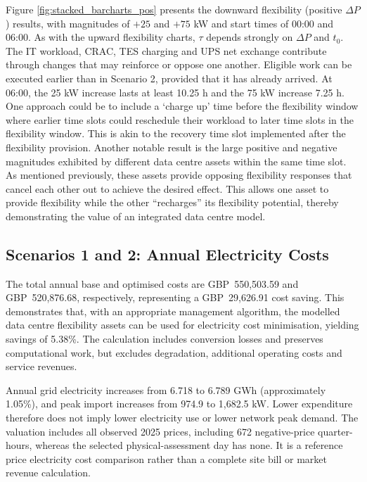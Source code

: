 \documentclass[lettersize,journal]{IEEEtran}
\newcommand{\rev}[1]{#1}
\begin{document}
\rev{Figure \ref{fig:stacked_barcharts_pos} presents the downward flexibility (positive $\Delta P$) results, with magnitudes of $+25$ and $+75$ kW and start times of 00:00 and 06:00.} As  with the upward flexibility charts, $\tau$ depends strongly on  $\Delta P$ and $t_0$. The IT workload, CRAC, TES charging and UPS net exchange contribute through changes that may reinforce or oppose one another. Eligible work can be executed earlier than in Scenario 2, provided that it has already arrived. At 06:00, the 25 kW increase lasts at least 10.25 h and the 75 kW increase 7.25 h. One approach could be to include a `charge up' time before the flexibility window where earlier time slots could reschedule their workload to later time slots in the flexibility window. This is akin to the recovery time slot implemented after the flexibility provision. Another notable result is the large positive and negative magnitudes exhibited by different data centre assets within the same time slot. As mentioned previously, these assets provide opposing flexibility responses that cancel each other out to achieve the desired effect. This allows one asset to provide flexibility while the other ``recharges'' its flexibility potential, thereby demonstrating the value of an integrated data centre model.

\subsection{Scenarios 1 and 2: Annual Electricity Costs}
\rev{The total annual base and optimised costs are GBP~550,503.59 and GBP~520,876.68, respectively, representing a GBP~29,626.91 cost saving. This demonstrates that, with an appropriate management algorithm, the modelled data centre flexibility assets can be used for electricity cost minimisation, yielding savings of 5.38\%. The calculation includes conversion losses and preserves computational work, but excludes degradation, additional operating costs and service revenues.}

Annual grid electricity increases from 6.718 to 6.789 GWh (approximately 1.05\%), and peak import increases from 974.9 to 1,682.5 kW. Lower expenditure therefore does not imply lower electricity use or lower network peak demand. The valuation includes all observed 2025 prices, including 672 negative-price quarter-hours, whereas the selected physical-assessment day has none. It is a reference price electricity cost comparison rather than a complete site bill or market revenue calculation.
\end{document}
